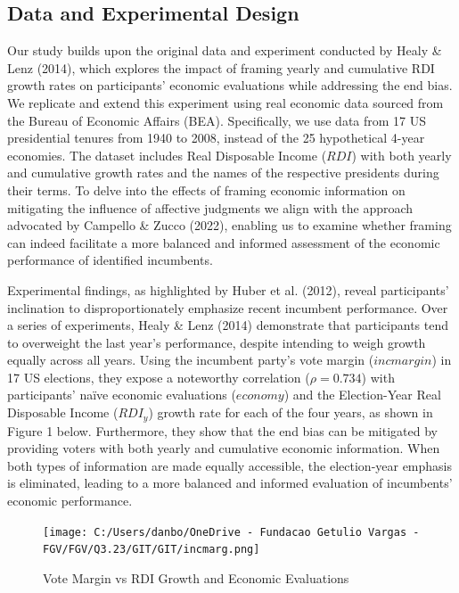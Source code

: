 \documentclass[
]{article}
\begin{document}
\hypertarget{data-and-experimental-design}{%
\subsection{Data and Experimental
Design}\label{data-and-experimental-design}}

Our study builds upon the original data and experiment conducted by
Healy \& Lenz (2014), which explores the impact of framing yearly and
cumulative RDI growth rates on participants' economic evaluations while
addressing the end bias. We replicate and extend this experiment using
real economic data sourced from the Bureau of Economic Affairs (BEA).
Specifically, we use data from 17 US presidential tenures from 1940 to
2008, instead of the 25 hypothetical 4-year economies. The dataset
includes Real Disposable Income (\(RDI\)) with both yearly and
cumulative growth rates and the names of the respective presidents
during their terms. To delve into the effects of framing economic
information on mitigating the influence of affective judgments we align
with the approach advocated by Campello \& Zucco (2022), enabling us to
examine whether framing can indeed facilitate a more balanced and
informed assessment of the economic performance of identified
incumbents.

Experimental findings, as highlighted by Huber et al. (2012), reveal
participants' inclination to disproportionately emphasize recent
incumbent performance. Over a series of experiments, Healy \& Lenz
(2014) demonstrate that participants tend to overweight the last year's
performance, despite intending to weigh growth equally across all years.
Using the incumbent party's vote margin (\(incmargin\)) in 17 US
elections, they expose a noteworthy correlation (\(\rho = 0.734\)) with
participants' naïve economic evaluations (\(economy\)) and the
Election-Year Real Disposable Income (\(RDI_y\)) growth rate for each of
the four years, as shown in Figure 1 below. Furthermore, they show that
the end bias can be mitigated by providing voters with both yearly and
cumulative economic information. When both types of information are made
equally accessible, the election-year emphasis is eliminated, leading to
a more balanced and informed evaluation of incumbents' economic
performance.

\begin{figure}
\hypertarget{fig:label}{%
\centering
\texttt{[image: C:/Users/danbo/OneDrive - Fundacao Getulio Vargas - FGV/FGV/Q3.23/GIT/GIT/incmarg.png]}
\caption{Vote Margin vs RDI Growth and Economic
Evaluations}\label{fig:label}
}
\end{figure}
\end{document}
